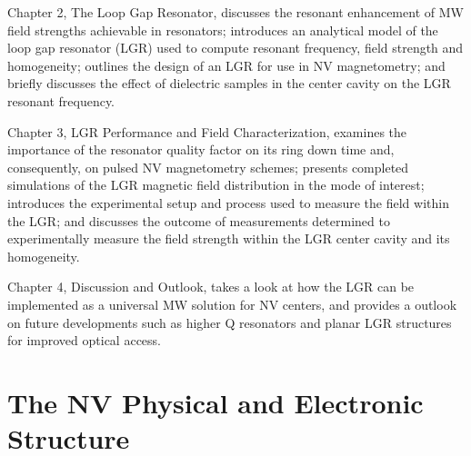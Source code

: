 Chapter 2, The Loop Gap Resonator, discusses the resonant enhancement of MW field strengths achievable in resonators; introduces an analytical model of the loop gap resonator (LGR) used to compute resonant frequency, field strength and homogeneity; outlines the design of an LGR for use in NV magnetometry; and briefly discusses the effect of dielectric samples in the center cavity on the LGR resonant frequency.


Chapter 3, LGR Performance and Field Characterization, examines the importance of the resonator quality factor on its ring down time and, consequently, on pulsed NV magnetometry schemes; presents completed simulations of the LGR magnetic field distribution in the mode of interest; introduces the experimental setup and process used to measure the field within the LGR; and discusses the outcome of measurements determined to experimentally measure the field strength within the LGR center cavity and its homogeneity.  

Chapter 4, Discussion and Outlook, takes a look at how the LGR can be implemented as a universal MW solution for NV centers, and   provides a outlook on future developments such as higher Q resonators and planar LGR structures for improved optical access.


\section{The NV Physical and Electronic Structure} \label{sec:NVP}


